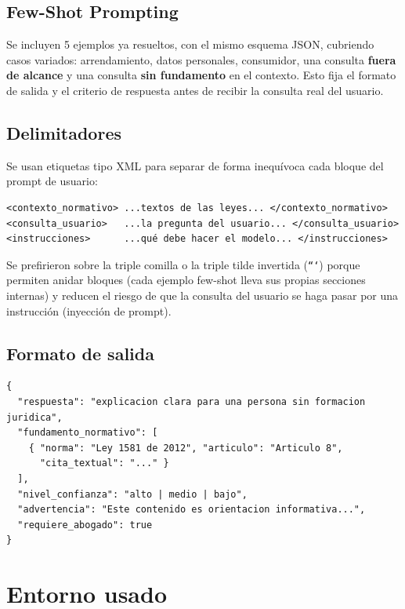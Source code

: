 \documentclass[11pt]{article}
\begin{document}
\subsection{Few-Shot Prompting}

Se incluyen 5 ejemplos ya resueltos, con el mismo esquema JSON, cubriendo
casos variados: arrendamiento, datos personales, consumidor, una consulta
\textbf{fuera de alcance} y una consulta \textbf{sin fundamento} en el
contexto. Esto fija el formato de salida y el criterio de respuesta antes de
recibir la consulta real del usuario.

\subsection{Delimitadores}

Se usan etiquetas tipo XML para separar de forma inequívoca cada bloque del
prompt de usuario:

\begin{lstlisting}
<contexto_normativo> ...textos de las leyes... </contexto_normativo>
<consulta_usuario>   ...la pregunta del usuario... </consulta_usuario>
<instrucciones>      ...qué debe hacer el modelo... </instrucciones>
\end{lstlisting}

Se prefirieron sobre la triple comilla o la triple tilde invertida
(\texttt{```}) porque permiten anidar bloques (cada ejemplo few-shot lleva
sus propias secciones internas) y reducen el riesgo de que la consulta del
usuario se haga pasar por una instrucción (inyección de prompt).

\subsection{Formato de salida}

\begin{lstlisting}
{
  "respuesta": "explicacion clara para una persona sin formacion juridica",
  "fundamento_normativo": [
    { "norma": "Ley 1581 de 2012", "articulo": "Articulo 8",
      "cita_textual": "..." }
  ],
  "nivel_confianza": "alto | medio | bajo",
  "advertencia": "Este contenido es orientacion informativa...",
  "requiere_abogado": true
}
\end{lstlisting}

\section{Entorno usado}
\end{document}
